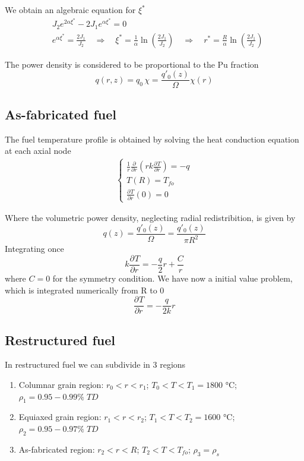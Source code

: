 \documentclass{article}
\newcommand{\pderiv}[3][]{\frac{\partial^{#1} #2}{\partial #3^{#1}}}
\begin{document}
We obtain an algebraic equation for \(\xi^*\)
\begin{align*}
  & J_2e^{2\alpha\xi^*} - 2J_1e^{\alpha\xi^*} = 0\\
  & e^{\alpha\xi^*} = \frac{2J_1}{J_2}  \quad \Rightarrow \quad \xi^* = \frac{1}{\alpha}\ln\left(\frac{2J_1}{J_2}\right) \quad \Rightarrow \quad r^* = \frac{R}{\alpha}\ln\left(\frac{2J_1}{J_2}\right)
\end{align*}

The power density is considered to be proportional to the Pu fraction
\[
  q(r,z) = q_0\, \chi  = \frac{ q'_0(z) }{\Omega}\chi(r)
\]

\subsection{As-fabricated fuel}
The fuel temperature profile is obtained by solving the heat conduction equation at each axial node
\begin{align*}
  \begin{cases}
   \frac{1}{r}\pderiv{}{r}\left(r k \pderiv{T}{r}\right) = -q\\
    T(R) = T_{fo} \\
    \pderiv{T}{r}(0) = 0
  \end{cases}
\end{align*}

Where the volumetric power density, neglecting radial redistribition, is given by
\[
  q(z) = \frac{q'_0(z)}{\Omega} = \frac{q'_0(z)}{\pi R^2}
\]
Integrating once
\[
  k\pderiv{T}{r} = -\frac{q}{2}r + \frac{C}{r}
\]
where $C = 0$ for the symmetry condition. We have now a initial value problem, which is integrated numerically from R to 0
\[
  \pderiv{T}{r} = -\frac{q}{2k}r
\]

\subsection{Restructured fuel}
In restructured fuel we can subdivide in 3 regions
\begin{enumerate}
  \item Columnar grain region: \(r_0 < r < r_1\);  \(T_0 < T < T_1 = 1800\) °C;  \(\rho_1 = 0.95 - 0.99\%\; TD\)\\
  \item Equiaxed grain region: \(r_1 < r < r_2\);  \(T_1 < T < T_2 = 1600\) °C;  \(\rho_2 = 0.95 - 0.97\%\; TD\)\\
  \item As-fabricated region: \(r_2 < r < R\);  \(T_2 < T < T_{fo}\);  \(\rho_3 = \rho_s\)\\
\end{enumerate}
\end{document}
